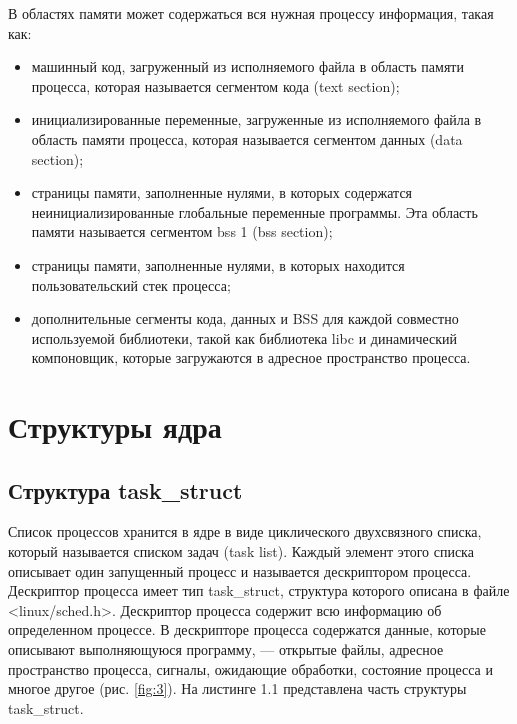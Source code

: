 В областях памяти может содержаться вся нужная процессу информация, такая как:

\begin{itemize}
	\item машинный код, загруженный из исполняемого файла в область памяти процесса, которая называется сегментом кода (text section);
	\item инициализированные переменные, загруженные из исполняемого файла в область памяти процесса, которая называется сегментом данных (data section);
	\item страницы памяти, заполненные нулями, в которых содержатся неинициализированные глобальные переменные программы. Эта область памяти называется сегментом bss 1 (bss section);
	\item страницы памяти, заполненные нулями, в которых находится пользовательский стек процесса;
	\item дополнительные сегменты кода, данных и BSS для каждой совместно используемой библиотеки, такой как библиотека libc и динамический компоновщик, которые загружаются в адресное пространство процесса.
\end{itemize}

\section{Структуры ядра}

\subsection{Структура task\_struct}

Список процессов хранится в ядре в виде циклического двухсвязного списка, 
который называется списком задач (task list). 
Каждый элемент этого списка описывает один
запущенный процесс и называется дескриптором процесса. Дескриптор процесса имеет
тип task\_struct, структура которого описана в файле <linux/sched.h>. 
Дескриптор процесса содержит всю информацию об определенном процессе.
В дескрипторе процесса содержатся данные, которые описывают выполняющуюся
программу, — открытые файлы, адресное пространство процесса, сигналы, ожидающие
обработки, состояние процесса и многое другое (рис. \ref{fig:3}). 
На листинге 1.1 представлена часть структуры task\_struct.

